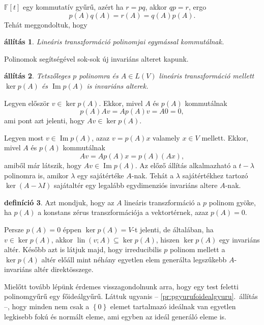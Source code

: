 \documentclass[a4paper, showtrims]{memoir}
\makeatletter
\renewenvironment{proof}[1][\proofname]
    {\par\pushQED{\qed}%
    \normalfont \topsep6\p@\@plus6\p@\relax
    \trivlist
    \item[\hskip\labelsep
        \itshape
    #1\@addpunct{:}]\ignorespaces}
    {\popQED\endtrivlist\@endpefalse}
\theoremstyle{plain}
\newtheorem{proposition}{állítás}[chapter]
\theoremstyle{remark}
\theoremstyle{definition}
\newtheorem{definition}[proposition]{definíció}
\DeclareMathOperator{\lin}{lin}
\DeclareMathOperator{\im}{Im}
\makeatother
\begin{document}
$\mathbb{F}\left[ t \right]$ egy kommutatív gyűrű,
azért ha $r=pq$, akkor $qp=r$,
ergo
\[
	p\left( A \right)q\left( A \right)=r\left( A \right)=q\left( A \right)p\left( A \right).
\]
Tehát meggondoltuk, hogy
\begin{proposition}
	Lineáris transzformáció polinomjai egymással kommutálnak.
\end{proposition}
Polinomok segítségével sok-sok új invariáns alteret kapunk.
\begin{proposition}
	Tetszőleges $p$ polinomra és $A\in L\left( V \right)$
	lineáris transzformáció mellett
	$\ker p\left( A \right)$ és $\im p\left( A \right)$ is invariáns alterek.
\end{proposition}
\begin{proof}
	Legyen először $v\in\ker p\left( A \right)$.
	Ekkor, mivel $A$ és $p\left( A \right)$ kommutálnak
	\[
		p\left( A \right)Av=Ap\left( A \right)v=A0=0,
	\]
	ami pont azt jelenti, hogy $Av\in\ker p\left( A \right)$.

	Legyen most $v\in\im p\left( A \right)$,
	azaz
	$v=p\left( A \right)x$ valamely $x\in V$ mellett.
	Ekkor, mivel $A$ és $p\left( A \right)$ kommutálnak
	\[
		Av=Ap\left( A \right)x=p\left( A \right)\left( Ax \right),
	\]
	amiből már látszik, hogy $Av\in\im p\left( A \right)$.
\end{proof}
Az előző állítás alkalmazható a $t-\lambda$ polinomra is,
amikor $\lambda$ egy sajátértéke $A$-nak. 
Tehát a $\lambda$ sajátértékhez tartozó
$\ker \left( A-\lambda I \right)$ sajátaltér egy legalább egydimenziós invariáns altere
$A$-nak.
\begin{definition}
	Azt mondjuk, hogy az $A$ lineáris transzformáció a $p$ polinom gyöke,
	ha $p\left( A \right)$ a konstans zérus transzformációja a vektortérnek,
    azaz $p\left( A \right)=0$.
\end{definition}
Persze $p\left( A \right)=0$ éppen $\ker p\left( A \right)=V$-t jelenti, de általában, 
ha $v\in\ker p\left( A \right)$, akkor 
$\lin(v;A)\subseteq\ker p\left( A \right)$, hiszen $\ker p\left( A \right)$ egy invariáns altér.
Később azt is látjuk majd, hogy irreducibilis $p$ polinom mellett a $\ker p\left( A \right)$ 
altér előáll mint néhány egyetlen elem generálta legszűkebb $A$-invariáns altér direktösszege.

Mielőtt tovább lépünk érdemes visszagondolnunk arra,
hogy egy test feletti polinomgyűrű egy főideálgyűrű.
Láttuk ugyanis
-- \ref{pr:pgyurufoidealgyuru}.~állítás --,
hogy minden nem csak a $\left\{ 0 \right\}$ elemet tartalmazó ideálnak
van egyetlen legkisebb fokú és normált eleme,
ami egyben az ideál generáló eleme is.
\end{document}
